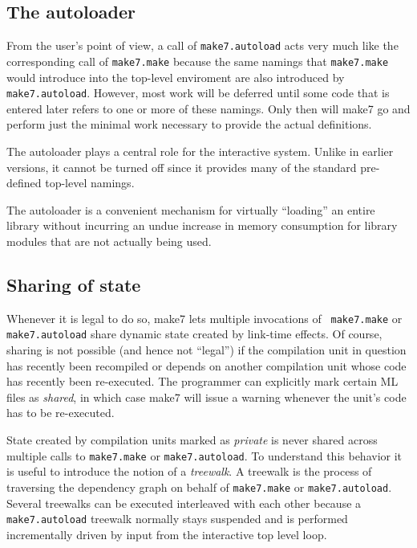 \subsection{The autoloader}
\label{sec:autoload}

From the user's point of view, a call of {\tt make7.autoload} acts very
much like the corresponding call of {\tt make7.make} because the same
namings that {\tt make7.make} would introduce into the top-level
enviroment are also introduced by {\tt make7.autoload}.  However, most
work will be deferred until some code that is entered later refers to
one or more of these namings.  Only then will make7 go and perform just
the minimal work necessary to provide the actual definitions.

The autoloader plays a central role for the interactive system.
Unlike in earlier versions, it cannot be turned off since it provides
many of the standard pre-defined top-level namings.

The autoloader is a convenient mechanism for virtually ``loading'' an
entire library without incurring an undue increase in memory
consumption for library modules that are not actually being used.

\subsection{Sharing of state}
\label{sec:sharing}

Whenever it is legal to do so, make7 lets multiple invocations of {\tt
make7.make} or {\tt make7.autoload} share dynamic state created by link-time
effects.  Of course, sharing is not possible (and hence not ``legal'')
if the compilation unit in question has recently been recompiled or
depends on another compilation unit whose code has recently been
re-executed.  The programmer can explicitly mark certain ML files as
{\em shared}, in which case make7 will issue a warning whenever the
unit's code has to be re-executed.

State created by compilation units marked as {\em private} is never
shared across multiple calls to {\tt make7.make} or {\tt make7.autoload}.
To understand this behavior it is useful to introduce the notion of a
{\em treewalk}.  A treewalk is the process of traversing the
dependency graph on behalf of {\tt make7.make} or {\tt make7.autoload}.
Several treewalks can be executed interleaved with each other because
a {\tt make7.autoload} treewalk normally stays suspended and is
performed incrementally driven by input from the interactive top level
loop.

